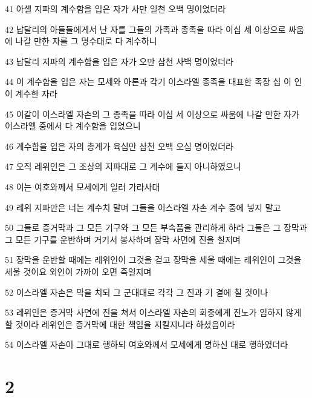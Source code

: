 \par 41 아셀 지파의 계수함을 입은 자가 사만 일천 오백 명이었더라
\par 42 납달리의 아들들에게서 난 자를 그들의 가족과 종족을 따라 이십 세 이상으로 싸움에 나갈 만한 자를 그 명수대로 다 계수하니
\par 43 납달리 지파의 계수함을 입은 자가 오만 삼천 사백 명이었더라
\par 44 이 계수함을 입은 자는 모세와 아론과 각기 이스라엘 종족을 대표한 족장 십 이 인이 계수한 자라
\par 45 이같이 이스라엘 자손의 그 종족을 따라 이십 세 이상으로 싸움에 나갈 만한 자가 이스라엘 중에서 다 계수함을 입었으니
\par 46 계수함을 입은 자의 총계가 육십만 삼천 오백 오십 명이었더라
\par 47 오직 레위인은 그 조상의 지파대로 그 계수에 들지 아니하였으니
\par 48 이는 여호와께서 모세에게 일러 가라사대
\par 49 레위 지파만은 너는 계수치 말며 그들을 이스라엘 자손 계수 중에 넣지 말고
\par 50 그들로 증거막과 그 모든 기구와 그 모든 부속품을 관리하게 하라 그들은 그 장막과 그 모든 기구를 운반하며 거기서 봉사하며 장막 사면에 진을 칠지며
\par 51 장막을 운반할 때에는 레위인이 그것을 걷고 장막을 세울 때에는 레위인이 그것을 세울 것이요 외인이 가까이 오면 죽일지며
\par 52 이스라엘 자손은 막을 치되 그 군대대로 각각 그 진과 기 곁에 칠 것이나
\par 53 레위인은 증거막 사면에 진을 쳐서 이스라엘 자손의 회중에게 진노가 임하지 않게 할 것이라 레위인은 증거막에 대한 책임을 지킬지니라 하셨음이라
\par 54 이스라엘 자손이 그대로 행하되 여호와께서 모세에게 명하신 대로 행하였더라

\chapter{2}


